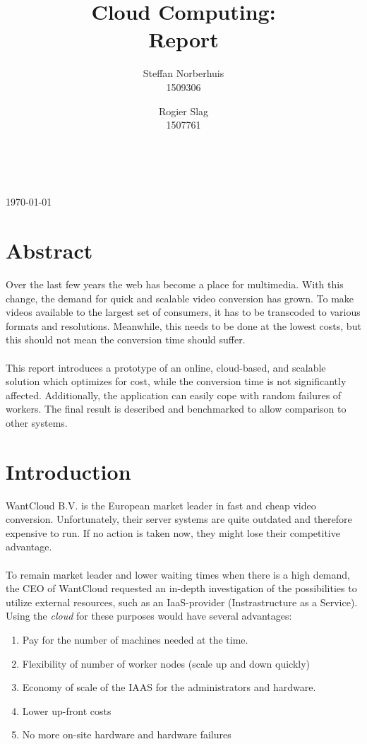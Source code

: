 \documentclass[a4paper]{IEEEtran}
\title{Cloud Computing: \\ Report}
\author{Steffan Norberhuis\\ 1509306 \and
 Rogier Slag\\ 1507761}
\author{
    \IEEEauthorblockN{Steffan Norberhuis, Rogier Slag}\\
    \IEEEauthorblockA{1509306, 1507761}
}
\begin{document}
\maketitle
\begin{center}
\today
\end{center}

\section{Abstract}

Over the last few years the web has become a place for multimedia.
With this change, the demand for quick and scalable video conversion has grown.
To make videos available to the largest set of consumers, it has to be transcoded to various formats and resolutions.
Meanwhile, this needs to be done at the lowest costs, but this should not mean the conversion time should suffer.\\
\\
This report introduces a prototype of an online, cloud-based, and scalable solution which optimizes for cost, while the conversion time is not significantly affected. 
Additionally, the application can easily cope with random failures of workers.
The final result is described and benchmarked to allow comparison to other systems.

\section{Introduction}


WantCloud B.V. is the European market leader in fast and cheap video conversion.
Unfortunately, their server systems are quite outdated and therefore expensive to run.
If no action is taken now, they might lose their competitive advantage.\\
\\
To remain market leader and lower waiting times when there is a high demand, the CEO of WantCloud requested an in-depth investigation of the possibilities to utilize external resources, such as an IaaS-provider (Instrastructure as a Service).
Using the \textit{cloud} for these purposes would have several advantages:

\begin{enumerate}
\item Pay for the number of machines needed at the time.
\item Flexibility of number of worker nodes (scale up and down quickly)
\item Economy of scale of the IAAS for the administrators and hardware.
\item Lower up-front costs
\item No more on-site hardware and hardware failures
\end{enumerate}
\end{document}
